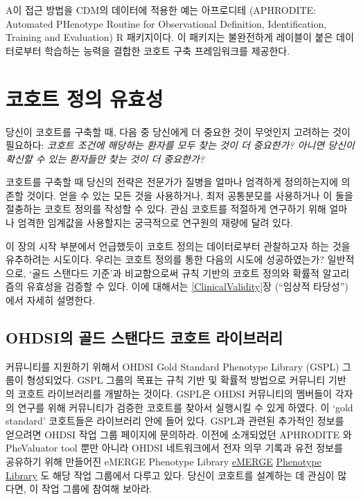 \documentclass[11pt]{book}
\theoremstyle{definition}
\theoremstyle{definition}
\theoremstyle{definition}
\theoremstyle{remark}
\begin{document}
A이 접근 방법을 CDM의 데이터에 적용한 예는 아프로디테 (APHRODITE:
Automated PHenotype Routine for Observational Definition,
Identification, Training and Evaluation) R 패키지이다. 이 패키지는
불완전하게 레이블이 붙은 데이터로부터 학습하는 능력을 결합한 코호트 구축
프레임워크를 제공한다. \citep{Banda2017APHRODITE} 

\section{코호트 정의 유효성}\label{--}

당신이 코호트를 구축할 때, 다음 중 당신에게 더 중요한 것이 무엇인지
고려하는 것이 필요하다: \emph{코호트 조건에 해당하는 환자를 모두 찾는
것이 더 중요한가? 아니면 당신이 확신할 수 있는 환자들만 찾는 것이 더
중요한가?}

코호트를 구축할 때 당신의 전략은 전문가가 질병을 얼마나 엄격하게
정의하는지에 의존할 것이다. 얻을 수 있는 모든 것을 사용하거나, 최저
공통분모를 사용하거나 이 둘을 절충하는 코호트 정의를 작성할 수 있다.
관심 코호트를 적절하게 연구하기 위해 얼마나 엄격한 임계값을 사용할지는
궁극적으로 연구원의 재량에 달려 있다.

이 장의 시작 부분에서 언급했듯이 코호트 정의는 데이터로부터 관찰하고자
하는 것을 유추하려는 시도이다. 우리는 코호트 정의를 통한 다음의 시도에
성공하였는가? 일반적으로, `골드 스탠다드 기준'과 비교함으로써 규칙
기반의 코호트 정의와 확률적 알고리즘의 유효성을 검증할 수 있다. 이에
대해서는 \ref{ClinicalValidity}장 (``임상적 타당성'') 에서 자세히
설명한다.

\subsection{OHDSI의 골드 스탠다드 코호트 라이브러리}\label{ohdsi----}

커뮤니티를 지원하기 위해서 OHDSI Gold Standard Phenotype Library (GSPL)
그룹이 형성되었다. GSPL 그룹의 목표는 규칙 기반 및 확률적 방법으로
커뮤니티 기반의 코호트 라이브러리를 개발하는 것이다. GSPL은 OHDSI
커뮤니티의 멤버들이 각자의 연구를 위해 커뮤니티가 검증한 코호트를 찾아서
실행시킬 수 있게 하였다. 이 `gold standard' 코호트들은 라이브러리 안에
들어 있다. GSPL과 관련된 추가적인 정보를 얻으려면 OHDSI 작업 그룹
페이지에 문의하라. 이전에 소개되었던 APHRODITE
\citep{Banda2017APHRODITE} 와 PheValuator tool
\citep{Swerdel2019phevaluator} 뿐만 아니라 OHDSI 네트워크에서 전자 의무
기록과 유전 정보를 공유하기 위해 만들어진 eMERGE Phenotype Library
\href{https://emerge.mc.vanderbilt.edu/}{eMERGE}
\href{https://phekb.org/phenotypes}{Phenotype Library}
\citep{Hripcsak2019eMERGE} 도 해당 작업 그룹에서 다루고 있다. 당신이
코호트를 설계하는 데 관심이 많다면, 이 작업 그룹에 참여해 보아라.
\end{document}

